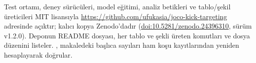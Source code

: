 \documentclass[pdflatex,sn-basic]{sn-jnl}
\begin{document}
Test ortamı, deney sürücüleri, model eğitimi, analiz betikleri ve tablo/şekil üreticileri MIT
lisansıyla \url{https://github.com/ufukasia/joco-kick-targeting} adresinde açıktır; kalıcı kopya
Zenodo'dadır (\href{https://doi.org/10.5281/zenodo.24396310}{doi:10.5281/zenodo.24396310}, sürüm
v1.2.0). Deponun README dosyası, her tablo ve şekli üreten komutları ve dosya düzenini listeler.
, makaledeki başlıca sayıları ham koşu kayıtlarından yeniden
hesaplayarak doğrular.


\end{document}
